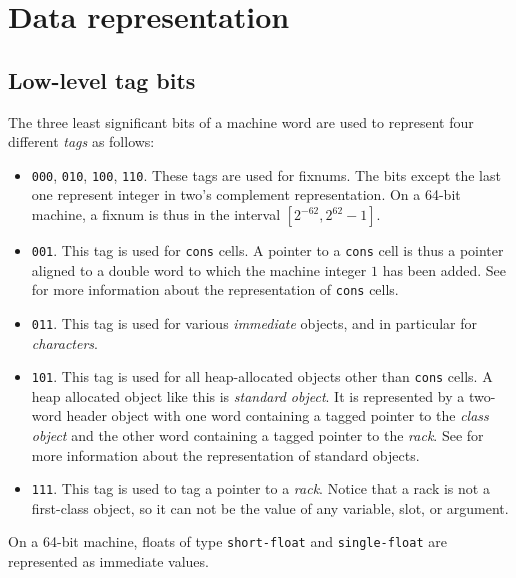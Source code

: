 \chapter{Data representation}
\label{chap-data-representation}

\section{Low-level tag bits}

The three least significant bits of a machine word are used to
represent four different \emph{tags} as follows:

\begin{itemize}
\item \texttt{000}, \texttt{010}, \texttt{100}, \texttt{110}.  These
  tags are used for fixnums.  The bits except the last one represent
  integer in two's complement representation.  On a 64-bit machine, a
  fixnum is thus in the interval $[2^{-62}, 2^{62} - 1]$.
\item \texttt{001}.  This tag is used for \texttt{cons} cells.  A
  pointer to a \texttt{cons} cell is thus a pointer aligned to a
  double word to which the machine integer $1$ has been added.  See
   for more information
  about the representation of \texttt{cons} cells.
\item \texttt{011}.  This tag is used for various \emph{immediate}
  objects, and in particular for \emph{characters}.
\item \texttt{101}.  This tag is used for all heap-allocated
  \commonlisp{} objects other than \texttt{cons} cells.  A heap
  allocated object like this is \emph{standard object}.  It
  is represented by a two-word header object with one word containing
  a tagged pointer to the \emph{class object} and the other word
  containing a tagged pointer to the \emph{rack}.  See
   for more
  information about the representation of standard objects.
\item \texttt{111}.  This tag is used to tag a pointer to a
  \emph{rack}.  Notice that a rack is not a first-class \commonlisp{}
  object, so it can not be the value of any variable, slot, or
  argument.
\end{itemize}

On a 64-bit machine, floats of type \texttt{short-float} and
\texttt{single-float} are represented as immediate values.

